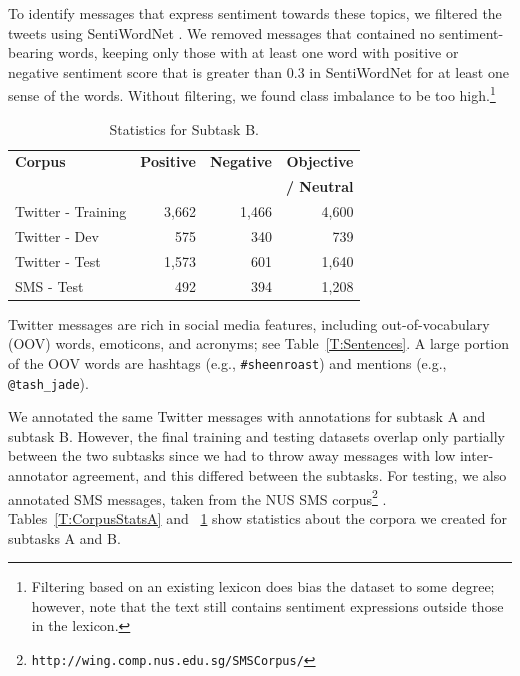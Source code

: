 To identify messages that express sentiment towards these topics, we filtered the tweets using SentiWordNet \cite{swn}.
We removed messages that contained no sentiment-bearing words, keeping only those with at least one word with positive or negative sentiment score
that is greater than 0.3 in SentiWordNet for at least one sense of the words.
Without filtering, we found class imbalance to be too high.\footnote{Filtering based on an existing lexicon does bias the dataset to some degree; however, note that the text still contains sentiment expressions outside those in the lexicon.}

 \begin{table}[h]
\small
\begin{center}
\begin{tabular}{|l |r |r | r |}
\hline
\bf Corpus & \bf Positive & \bf Negative & \bf Objective\\
& & & \bf / Neutral\\
\hline
Twitter - Training  & 3,662 & 1,466 &  4,600  \\
Twitter - Dev  & 575 & 340 & 739 \\
Twitter - Test  & 1,573 & 601 & 1,640   \\
SMS - Test  & 492 & 394 & 1,208  \\
\hline
\end{tabular}
\caption{Statistics for Subtask B.}
\label{T:CorpusStatsB}
\end{center}
\end{table}

Twitter messages are rich in social media features, including out-of-vocabulary (OOV) words, emoticons, and acronyms;
see Table~\ref{T:Sentences}.
A large portion of the OOV words are hashtags (e.g., \texttt{\#sheenroast})
and mentions (e.g., \texttt{@tash\_jade}).

We annotated the same Twitter messages with annotations for subtask A and subtask B.
However, the final training and testing datasets overlap only partially between the two subtasks
since we had to throw away messages with low inter-annotator agreement, and this differed between the subtasks.
For testing, we also annotated SMS messages, taken from the NUS SMS corpus\footnote{\texttt{http://wing.comp.nus.edu.sg/SMSCorpus/}} \cite{SMScorpus}.
Tables~\ref{T:CorpusStatsA} and ~\ref{T:CorpusStatsB} show statistics about the corpora we created for subtasks A and B.



